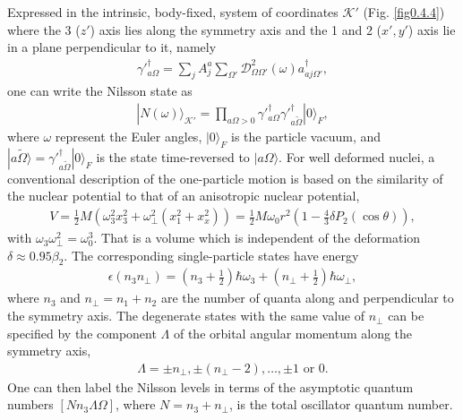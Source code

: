 \documentclass[a4paper,11pt]{book}
\numberwithin{equation}{section}
\numberwithin{figure}{section}
\numberwithin{table}{section}
\newcommand{\ket}[1]{|{#1} \rangle }
\begin{document}
Expressed in the intrinsic, body-fixed, system of coordinates $\mathcal K'$ (Fig. \ref{fig0.4.4}) where the 3 ($z'$) axis lies along the symmetry axis and the 1 and 2 ($x',y'$) axis lie in a plane perpendicular to it, namely
\begin{align}\label{eq0.4.6}
\gamma'^{\dagger}_{a\Omega}=\sum_jA_j^a\sum_{\Omega'}\mathcal D_{\Omega\Omega'}^2(\omega)a^\dagger_{aj\Omega'},
\end{align}
one can write the Nilsson state as 
\begin{align}\label{eq0.4.7}
\ket{N(\omega)}_{\mathcal K'}=\prod_{a\Omega>0}\gamma'^{\dagger}_{a\Omega}\gamma'^{\dagger}_{a\widetilde\Omega}\ket{0}_F,
\end{align}
where $\omega$ represent the Euler angles, $\ket{0}_F$ is the particle vacuum, and $\ket{a\widetilde\Omega}=\gamma'^{\dagger}_{a\widetilde\Omega}\ket{0}_F$ is the state time-reversed to $\ket{a\Omega}$. For well deformed nuclei, a conventional description of the one-particle motion is based on the similarity of the nuclear potential to that of an anisotropic nuclear potential, 
\begin{align}\label{eq0.4.8}
V=\frac{1}{2}M\left(\omega_3^2x_3^2+\omega^2_{\perp}(x_1^2+x_x^2)\right)=\frac{1}{2}M\omega_0r^2\left(1-\frac{4}{3}\delta P_2(\cos\theta)\right),
\end{align}
with $\omega_3\omega_{\perp}^2=\omega_0^3$. That is a volume which is independent of the deformation $\delta\approx0.95\beta_2$. The corresponding single-particle states have energy
\begin{align}\label{eq0.4.9}
\epsilon(n_3n_{\perp})=(n_3+\tfrac{1}{2})\hbar\omega_3+(n_{\perp}+\tfrac{1}{2})\hbar\omega_{\perp},
\end{align}
where $n_3$ and $n_{\perp}=n_1+n_2$ are the number of quanta along and perpendicular to the symmetry axis. The degenerate states with the same value of $n_{\perp}$ can be specified by the component $\Lambda$ of the orbital angular momentum along the symmetry axis,
\begin{align}\label{eq0.4.10}
\Lambda=\pm n_{\perp}, \pm(n_{\perp}-2),\dots,\pm 1\text{ or } 0.
\end{align}
One can then label the Nilsson levels in terms of the asymptotic quantum numbers $[Nn_3\Lambda\Omega]$, where $N=n_3+n_{\perp}$, is the total oscillator quantum number.
\end{document}
